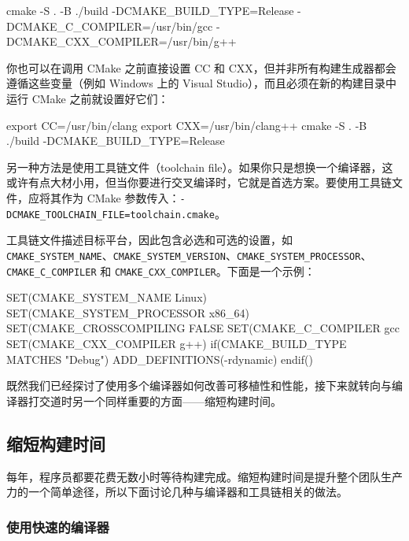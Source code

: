 \begin{codebox}[text]
cmake -S . -B ./build -DCMAKE_BUILD_TYPE=Release -DCMAKE_C_COMPILER=/usr/bin/gcc -DCMAKE_CXX_COMPILER=/usr/bin/g++
\end{codebox}

你也可以在调用 CMake 之前直接设置 CC 和 CXX，但并非所有构建生成器都会遵循这些变量（例如 Windows 上的 Visual Studio），而且必须在新的构建目录中运行 CMake 之前就设置好它们：

\begin{codebox}[text]
export CC=/usr/bin/clang
export CXX=/usr/bin/clang++
cmake -S . -B ./build -DCMAKE_BUILD_TYPE=Release
\end{codebox}

\label{idx:638}
另一种方法是使用工具链文件（toolchain file）。如果你只是想换一个编译器，这或许有点大材小用，但当你要进行交叉编译时，它就是首选方案。要使用工具链文件，应将其作为 CMake 参数传入：\texttt{-DCMAKE\_\allowbreak{}TOOLCHAIN\_\allowbreak{}FILE=\allowbreak{}toolchain.\allowbreak{}cmake}。

工具链文件描述目标平台，因此包含必选和可选的设置，如 \texttt{CMAKE\_\allowbreak{}SYSTEM\_\allowbreak{}NAME}、\texttt{CMAKE\_\allowbreak{}SYSTEM\_\allowbreak{}VERSION}、\texttt{CMAKE\_\allowbreak{}SYSTEM\_\allowbreak{}PROCESSOR}、\texttt{CMAKE\_\allowbreak{}C\_\allowbreak{}COMPILER} 和 \texttt{CMAKE\_\allowbreak{}CXX\_\allowbreak{}COMPILER}。下面是一个示例：

\begin{codebox}[text]
SET(CMAKE_SYSTEM_NAME Linux)
SET(CMAKE_SYSTEM_PROCESSOR x86_64)
SET(CMAKE_CROSSCOMPILING FALSE
SET(CMAKE_C_COMPILER gcc
SET(CMAKE_CXX_COMPILER g++)
if(CMAKE_BUILD_TYPE MATCHES "Debug")
  ADD_DEFINITIONS(-rdynamic)
endif()
\end{codebox}

\label{idx:639}
既然我们已经探讨了使用多个编译器如何改善可移植性和性能，接下来就转向与编译器打交道时另一个同样重要的方面——缩短构建时间。

\subsection{缩短构建时间}

\label{idx:640}
\label{idx:641}
每年，程序员都要花费无数小时等待构建完成。缩短构建时间是提升整个团队生产力的一个简单途径，所以下面讨论几种与编译器和工具链相关的做法。

\subsubsection{使用快速的编译器}

